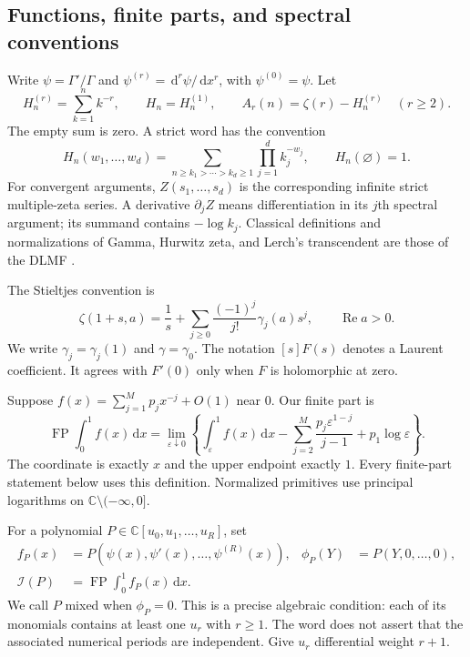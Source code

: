 \documentclass[11pt,a4paper]{article}
\numberwithin{equation}{section}
\theoremstyle{definition}
\theoremstyle{remark}
\DeclareMathOperator{\FP}{FP}
\DeclareMathOperator{\re}{Re}
\newcommand{\dd}{\,\mathrm d}
\newcommand{\C}{\mathbb C}
\newcommand{\cI}{\mathcal I}
\begin{document}
\subsection{Functions, finite parts, and spectral conventions}

Write $\psi=\Gamma'/\Gamma$ and $\psi^{(r)}=\dd^r\psi/\dd x^r$,
with $\psi^{(0)}=\psi$. Let
\[
 H_n^{(r)}=\sum_{k=1}^n k^{-r},\qquad H_n=H_n^{(1)},\qquad
 A_r(n)=\zeta(r)-H_n^{(r)}\quad(r\ge2).
\]
The empty sum is zero. A strict word has the convention
\[
 H_n(w_1,\ldots,w_d)=
 \sum_{n\ge k_1>\cdots>k_d\ge1}\prod_{j=1}^d k_j^{-w_j},
 \qquad H_n(\varnothing)=1.
\]
For convergent arguments, $Z(s_1,\ldots,s_d)$ is the corresponding
infinite strict multiple-zeta series. A derivative $\partial_j Z$
means differentiation in its $j$th spectral argument; its summand contains
$-\log k_j$. Classical definitions and normalizations of Gamma, Hurwitz
zeta, and Lerch's transcendent are those of the DLMF
\cite{DLMFGamma,DLMFZeta,DLMFLerch}.

The Stieltjes convention is
\begin{equation}\label{poly:stieltjes}
 \zeta(1+s,a)=\frac1s+
 \sum_{j\ge0}\frac{(-1)^j}{j!}\gamma_j(a)s^j,
 \qquad \re a>0.
\end{equation}
We write $\gamma_j=\gamma_j(1)$ and $\gamma=\gamma_0$.
The notation $[s]F(s)$ denotes a Laurent coefficient. It agrees with
$F'(0)$ only when $F$ is holomorphic at zero.

Suppose $f(x)=\sum_{j=1}^M p_jx^{-j}+O(1)$ near $0$. Our finite part is
\begin{equation}\label{poly:fp}
 \FP\int_0^1f(x)\dd x=
 \lim_{\varepsilon\downarrow0}
 \left\{\int_\varepsilon^1f(x)\dd x
 -\sum_{j=2}^M\frac{p_j\varepsilon^{1-j}}{j-1}
 +p_1\log\varepsilon\right\}.
\end{equation}
The coordinate is exactly $x$ and the upper endpoint exactly $1$.
Every finite-part statement below uses this definition. Normalized
primitives use principal logarithms on $\C\setminus(-\infty,0]$.

For a polynomial $P\in\C[u_0,u_1,\ldots,u_R]$, set
\begin{align*}
 f_P(x)&=P(\psi(x),\psi'(x),\ldots,\psi^{(R)}(x)),&
 \phi_P(Y)&=P(Y,0,\ldots,0),\\
 \cI(P)&=\FP\int_0^1f_P(x)\dd x.
\end{align*}
We call $P$ mixed when $\phi_P=0$. This is a precise algebraic condition:
each of its monomials contains at least one $u_r$ with $r\ge1$.
The word does not assert that the associated numerical periods are
independent. Give $u_r$ differential weight $r+1$.
\end{document}
